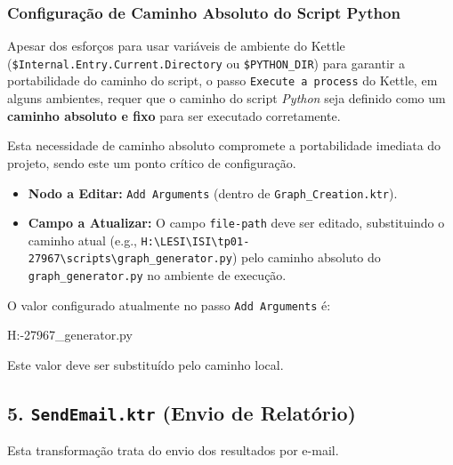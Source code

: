 \documentclass[a4paper, 12pt]{article}
\begin{document}
	\subsubsection{Configuração de Caminho Absoluto do Script Python}
	Apesar dos esforços para usar variáveis de ambiente do Kettle
	\newline (\texttt{\${Internal.Entry.Current.Directory}} ou \texttt{\${PYTHON\_DIR}}) para garantir a portabilidade do caminho do script, o passo \texttt{Execute a process} do Kettle, em alguns ambientes, requer que o caminho do script \textit{Python} seja definido como um \textbf{caminho absoluto e fixo} para ser executado corretamente.
	
	Esta necessidade de caminho absoluto compromete a portabilidade imediata do projeto, sendo este um ponto crítico de configuração.
	
	\begin{itemize}
		\item \textbf{Nodo a Editar:} \texttt{Add Arguments} (dentro de \texttt{Graph\_Creation.ktr}).
		\item \textbf{Campo a Atualizar:} O campo \texttt{file-path} deve ser editado, substituindo o caminho atual
		\newline (e.g., \texttt{H:\textbackslash LESI\textbackslash ISI\textbackslash tp01-27967\textbackslash scripts\textbackslash graph\_generator.py}) pelo caminho absoluto do \texttt{graph\_generator.py} no ambiente de execução.
	\end{itemize}
	
	O valor configurado atualmente no passo \texttt{Add Arguments} é:
	\begin{KettleCode}
		H:\LESI\ISI{}-27967\scripts\graph_generator.py
	\end{KettleCode}
	Este valor deve ser substituído pelo caminho local.
	
	\subsection{5. \texttt{SendEmail.ktr} (Envio de Relatório)}
	Esta transformação trata do envio dos resultados por e-mail.
	
\end{document}
